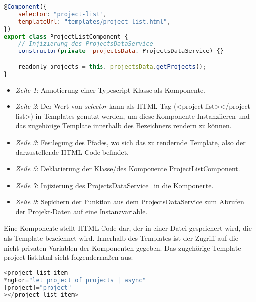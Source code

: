 \begin{lstlisting}[language=JavaScript,float=h!,caption={Funktion zum Abruf aller Projekte vom Server}, label={lst:example:component}]
@Component({
    selector: "project-list",
    templateUrl: "templates/project-list.html",
})
export class ProjectListComponent {
    // Injizierung des ProjectsDataService
    constructor(private _projectsData: ProjectsDataService) {}

    readonly projects = this._projectsData.getProjects();
}
\end{lstlisting}

\begin{itemize}
    \setlength\itemsep{-1em}
    \item \emph{Zeile 1}: Annotierung einer Typescript-Klasse als Komponente.
    \item \emph{Zeile 2}: Der Wert von \emph{selector} kann als HTML-Tag (<project-list></project-list>) in Templates genutzt werden,
    um diese Komponente Instanziieren und das zugehörige Template innerhalb des Bezeichners rendern zu können.
    \item \emph{Zeile 3}: Festlegung des Pfades, wo sich das zu rendernde Template, also der darzustellende HTML Code befindet.
    \item \emph{Zeile 5}: Deklarierung der Klasse/des Komponente ProjectListComponent.
    \item \emph{Zeile 7}: Injizierung des ProjectsDataService~\cite{angular-http} in die Komponente.
    \item \emph{Zeile 9}: Sepichern der Funktion aus dem ProjectsDataService zum Abrufen der Projekt-Daten auf eine Instanzvariable.
\end{itemize}

Eine Komponente stellt HTML Code dar, der in einer Datei gespeichert wird, die als Template bezeichnet wird.
Innerhalb des Templates ist der Zugriff auf die nicht privaten Variablen der Komponenten gegeben.
Das zugehörige Template project-list.html sieht folgendermaßen aus:

\begin{lstlisting}[language=JavaScript,float=h!,caption={Funktion zum Abruf aller Projekte vom Server}, label={lst:example:service}]
<project-list-item
*ngFor="let project of projects | async"
[project]="project"
></project-list-item>
\end{lstlisting}


